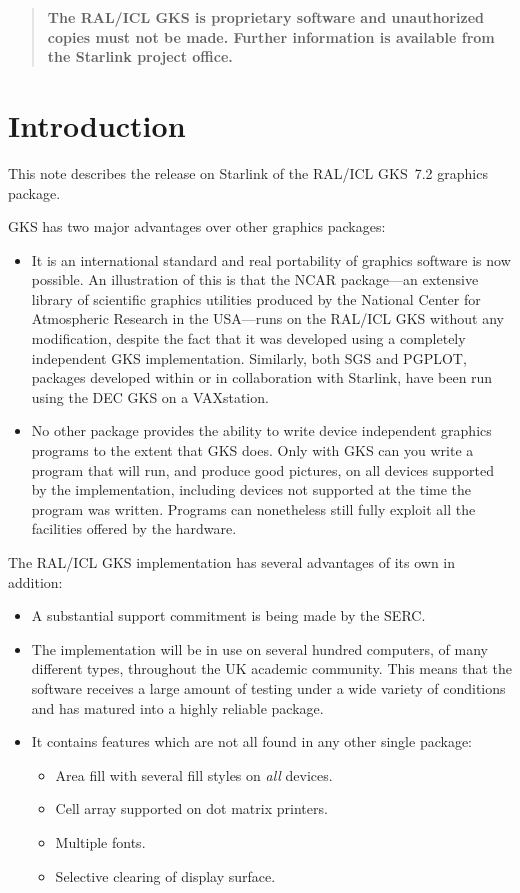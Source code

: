 \begin{quote}\bf
The RAL/ICL GKS is proprietary software and unauthorized copies must not be
made.
Further information is available from the Starlink project office.
\end{quote}

\section{Introduction}
This note describes the release on Starlink of the RAL/ICL GKS~7.2 graphics
package.

GKS has two major advantages over other graphics packages:
\begin{itemize}                   

\item It is an international standard and real portability of graphics software
is now possible. An illustration of this is that the NCAR
package---an extensive library of scientific graphics utilities produced by the
National Center for Atmospheric Research in the USA---runs on the RAL/ICL GKS
without any modification, despite the fact that it was developed using a
completely independent GKS implementation. Similarly, both SGS and PGPLOT,
packages developed within or in collaboration with Starlink, have been run
using the DEC GKS on a VAXstation. 

\item No other package provides the ability to write device independent graphics
programs to the extent that GKS does.
Only with GKS can you write a program that will run, and produce good pictures,
on all devices supported by the implementation, including devices not supported
at the time the program was written.
Programs can nonetheless still fully exploit all the facilities offered by the
hardware.
\end{itemize}
The RAL/ICL GKS implementation has several advantages of its own in addition:
\begin{itemize}
\item A substantial support commitment is being made by the SERC.
\item The implementation will be in use on several hundred computers, of many
different types, throughout the UK academic community.
This means that the software receives a large amount of testing under a wide
variety of conditions and has matured into a highly reliable package.
\item It contains features which are not all found in any other single package:
\begin{itemize}
\item Area fill with several fill styles on {\em all\/} devices.
\item Cell array supported on dot matrix printers.
\item Multiple fonts.
\item Selective clearing of display surface.
\end{itemize}
\end{itemize}
